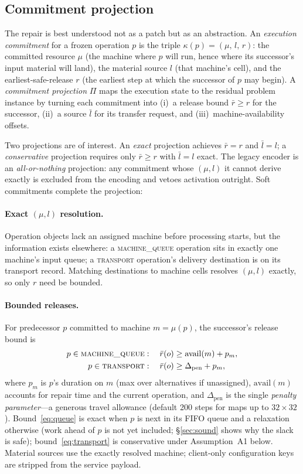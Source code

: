 \documentclass[twocolumn]{article}
\begin{document}
\subsection{Commitment projection}
The repair is best understood not as a patch but as an abstraction.
An \emph{execution commitment} for a frozen operation $p$ is the triple
$\kappa(p)=(\mu,\,l,\,r)$: the committed resource $\mu$ (the machine
where $p$ will run, hence where its successor's input material will
land), the material source $l$ (that machine's cell), and the
earliest-safe-release $r$ (the earliest step at which the successor of
$p$ may begin). A \emph{commitment projection}
$\Pi$ maps the execution state to the residual problem instance by
turning each commitment into (i)~a release bound $\bar r\ge r$ for the
successor, (ii)~a source $\bar l$ for its transfer request, and
(iii)~machine-availability offsets.

Two projections are of interest. An \emph{exact} projection achieves
$\bar r=r$ and $\bar l=l$; a \emph{conservative} projection requires only
$\bar r\ge r$ with $\bar l=l$ exact. The legacy encoder is an
\emph{all-or-nothing} projection: any commitment whose $(\mu,l)$ it
cannot derive exactly is excluded from the encoding and vetoes
activation outright. Soft commitments complete the projection:

\paragraph{Exact $(\mu,l)$ resolution.}
Operation objects lack an assigned machine before processing starts,
but the information exists elsewhere: a \textsc{machine\_queue}
operation sits in exactly one machine's input queue; a
\textsc{transport} operation's delivery destination is on its transport
record. Matching destinations to machine cells resolves $(\mu,l)$
exactly, so only $r$ need be bounded.

\paragraph{Bounded releases.}
For predecessor $p$ committed to machine $m=\mu(p)$, the successor's
release bound is
\begin{align}
p\in\textsc{machine\_queue}:\quad
\bar r(o) &\ge \mathrm{avail}(m) + p_m, \label{eq:queue}\\
p\in\textsc{transport}:\quad
\bar r(o) &\ge \Delta_{\mathrm{pen}} + p_m, \label{eq:transport}
\end{align}
where $p_m$ is $p$'s duration on $m$ (max over alternatives if
unassigned), $\mathrm{avail}(m)$ accounts for repair time and the
current operation, and $\Delta_{\mathrm{pen}}$ is the single
\emph{penalty parameter}---a generous travel allowance (default 200
steps for maps up to $32{\times}32$). Bound~\eqref{eq:queue} is exact
when $p$ is next in its FIFO queue and a relaxation otherwise
(work ahead of $p$ is not yet included; \S\ref{sec:sound} shows why the
slack is safe); bound~\eqref{eq:transport} is conservative under
Assumption~A1 below. Material sources use the exactly resolved machine;
client-only configuration keys are stripped from the service payload.
\end{document}
